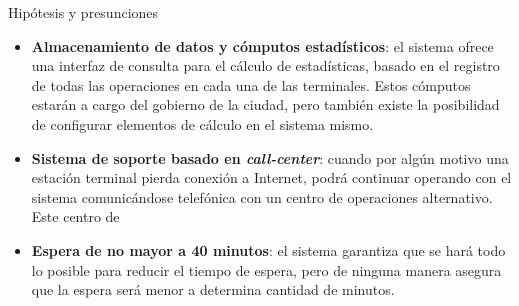 \begin{subsection}{Hipótesis y presunciones}
\begin{itemize}
\item \textbf{Almacenamiento de datos y cómputos estadísticos}: el sistema ofrece una interfaz de consulta para el cálculo de estadísticas, basado en el registro de todas las operaciones en cada una de las terminales. Estos cómputos estarán a cargo del gobierno de la ciudad, pero también existe la posibilidad de configurar elementos de cálculo en el sistema mismo.

\item \textbf{Sistema de soporte basado en \textit{call-center}}: cuando por algún motivo una estación terminal pierda conexión a Internet, podrá continuar operando con el sistema comunicándose telefónica con un centro de operaciones alternativo. Este centro de 

\item \textbf{Espera de no mayor a 40 minutos}: el sistema garantiza que se hará todo lo posible para reducir el tiempo de espera, pero de ninguna manera asegura que la espera será menor a determina cantidad de minutos.

\end{itemize}
\end{subsection}